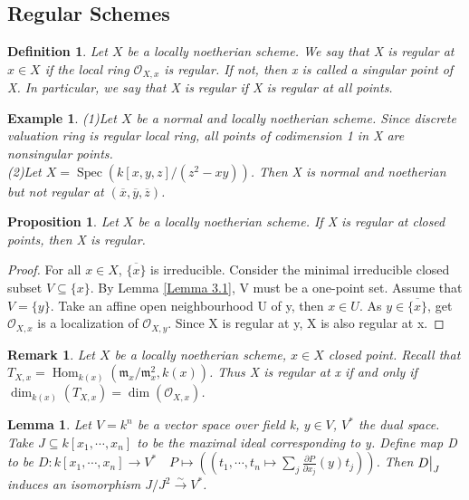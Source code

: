 \documentclass{ctexart}
\newtheorem{definition}{Definition}[section]
\newtheorem{remark}{Remark}[section]
\newtheorem{proposition}{Proposition}[section]
\newtheorem{lemma}{Lemma}[section]
\newtheorem{example}{Example}[section]
\renewcommand{\hom}{\operatorname{Hom}}
\newcommand{\spec}{\operatorname{Spec}}
\begin{document}
\subsection{Regular Schemes}
\begin{definition}
    Let $X$ be a locally noetherian scheme.
    We say that X is regular at $x\in X$ if the local ring $\mathcal{O}_{X, x}$ is regular.
    If not, then x is called a singular point of X.
    In particular, we say that X is regular if X is regular at all points.
\end{definition}
\begin{example}
    (1)Let $X$ be a normal and locally noetherian scheme.
    Since discrete valuation ring is regular local ring, all points of codimension 1 in X are nonsingular points. \\
    (2)Let $X = \spec(k[x, y, z]/(z^{2} - xy))$.
    Then X is normal and noetherian but not regular at $(\overline{x}, \overline{y}, \overline{z})$.
\end{example}
\begin{proposition}
    Let $X$ be a locally noetherian scheme.
    If X is regular at closed points, then X is regular.
    \label{Proposition 5.3}
\end{proposition}
\begin{proof}
    For all $x\in X$, $\overline{\{x\}}$ is irreducible.
    Consider the minimal irreducible closed subset $V \subseteq \{x\}$.
    By Lemma \ref{Lemma 3.1}, V must be a one-point set.
    Assume that $V = \{y\}$.
    Take an affine open neighbourhood U of y, then $x\in U$.
    As $y\in \overline{\{x\}}$, get $\mathcal{O}_{X, x}$ is a localization of $\mathcal{O}_{X, y}$.
    Since X is regular at y, X is also regular at x.
\end{proof}
\begin{remark}
    Let $X$ be a locally noetherian scheme, $x\in X$ closed point.
    Recall that $T_{X, x} = \hom_{k(x)}(\mathfrak{m}_{x}/\mathfrak{m}_{x}^{2}, k(x))$.
    Thus X is regular at x if and only if $\dim_{k(x)}(T_{X, x}) = \dim(\mathcal{O}_{X, x})$.
\end{remark}
\begin{lemma}
    Let $V = k^{n}$ be a vector space over field k, $y\in V$, $V^{\ast}$ the dual space.
    Take $J \subseteq k[x_{1}, \cdots, x_{n}]$ to be the maximal ideal corresponding to y.
    Define map D to be $D: k[x_{1}, \cdots, x_{n}] \longrightarrow V^{\ast}\quad P \longmapsto ((t_{1}, \cdots, t_{n} \mapsto \sum_{j} \frac{\partial P}{\partial x_{j}}(y)t_{j}))$.
    Then $D\big{|}_{J}$ induces an isomorphism $J/J^{2} \overset{\sim}{\longrightarrow} V^{\ast}$. 
    \label{Lemma 5.2}
\end{lemma}
\end{document}
